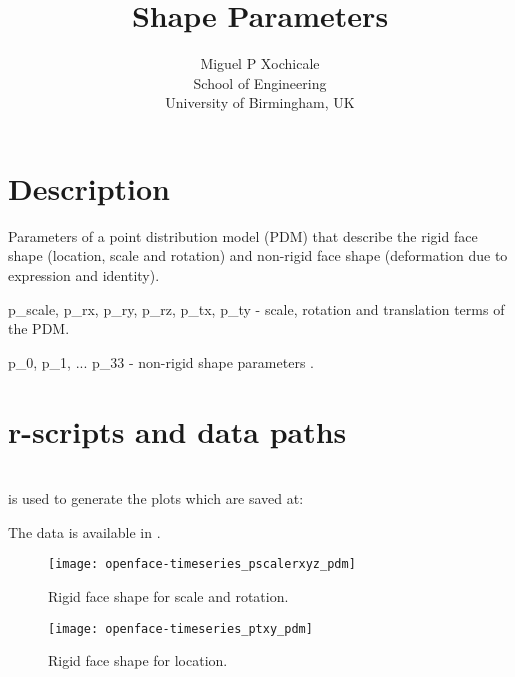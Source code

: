 \documentclass[a4paper,12pt]{article}
\title{Shape Parameters}
\author{Miguel P Xochicale \\
School of Engineering\\
University of Birmingham, UK}
\begin{document}
\maketitle

%


\section{Description}


Parameters of a point distribution model (PDM) that describe the rigid face shape 
(location, scale and rotation) and non-rigid face shape 
(deformation due to expression and identity). 

p\_scale, p\_rx, p\_ry, p\_rz, p\_tx, p\_ty - scale, rotation and 
translation terms of the PDM.

p\_0, p\_1, ... p\_33 - non-rigid shape parameters \cite{baltrusaitis2016}.


\section{r-scripts and data paths}
 \\
is used to generate the plots which are saved at: \\



The data is available in \cite{mxochicale2018}.










\begin{figure}
\centering
\texttt{[image: openface-timeseries\_pscalerxyz\_pdm]}
\caption{Rigid face shape for scale and rotation.}
\end{figure}

\begin{figure}
\centering
\texttt{[image: openface-timeseries\_ptxy\_pdm]}
\caption{Rigid face shape for location.}
\end{figure}
\end{document}
